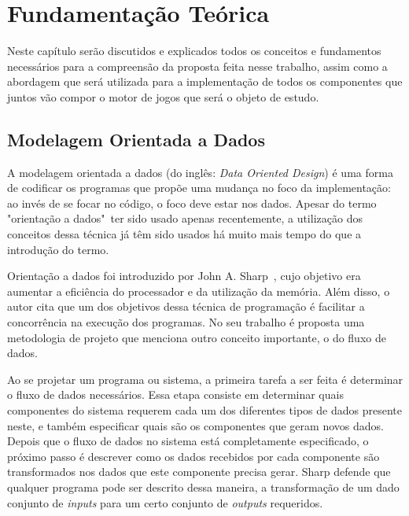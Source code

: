 \setlength\abovedisplayskip{0pt} \setlength\belowdisplayskip{0pt}
\setlength\abovedisplayshortskip{0pt} \setlength\belowdisplayshortskip{0pt}

\chapter{Fundamenta\c{c}\~ao Te\'orica}
\label{theorycap}

Neste capítulo serão discutidos e explicados todos os conceitos e 
fundamentos necessários para a compreensão da proposta 
feita nesse trabalho, assim como a abordagem que será utilizada 
para a implementação de todos os componentes que juntos vão compor 
o motor de jogos que será o objeto de estudo.

\section{Modelagem Orientada a Dados}
\label{secdataorienteddesign}

A modelagem orientada a dados (do inglês: \textit{Data Oriented Design}) é 
uma forma de codificar os programas que propõe uma mudança no foco da 
implementação: ao invés de se focar no código, o foco deve estar nos 
dados. Apesar do termo "orientação a dados"\ ter sido usado apenas recentemente, 
a utilização dos conceitos dessa técnica já têm sido usados há muito mais tempo 
do que a introdução do termo.

Orientação a dados foi introduzido por John A. Sharp~\cite{Sharp1980}, cujo objetivo 
era aumentar a eficiência do processador e da utilização da memória. Além disso, o autor 
cita que um dos objetivos dessa técnica de programação é facilitar a concorrência na 
execução dos programas. No seu trabalho é proposta uma metodologia de projeto que 
menciona outro conceito importante, o do fluxo de dados.

Ao se projetar um programa ou sistema, a primeira tarefa a ser feita é determinar o 
fluxo de dados necessários. Essa etapa consiste em determinar quais componentes do 
sistema requerem cada um dos diferentes tipos de dados presente neste, e também 
especificar quais são os componentes que geram novos dados. Depois que o fluxo de dados 
no sistema está completamente especificado, o próximo passo é descrever como os dados 
recebidos por cada componente são transformados nos dados que este componente precisa 
gerar. Sharp defende que qualquer programa pode ser descrito dessa maneira, a 
transformação de um dado conjunto de \textit{inputs} para um certo conjunto de 
\textit{outputs} requeridos.

